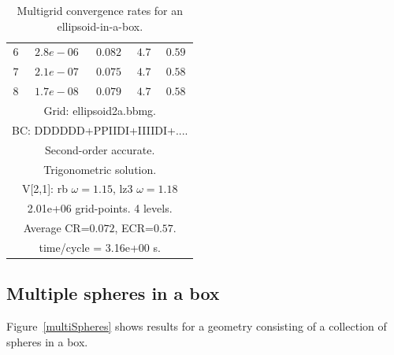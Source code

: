 \begin{table}[hbt]
\begin{center}
{\begin{tabular}{|c|c|c|c|c|}
 $ 6$  & $ 2.8e-06$ & $0.082$ & $ 4.7$ & $0.59$ \\ 
 $ 7$  & $ 2.1e-07$ & $0.075$ & $ 4.7$ & $0.58$ \\ 
 $ 8$  & $ 1.7e-08$ & $0.079$ & $ 4.7$ & $0.58$ \\ 
\hline 
\multicolumn{5}{|c|}{Grid: ellipsoid2a.bbmg.}  \\
\multicolumn{5}{|c|}{BC: DDDDDD+PPIIDI+IIIIDI+....}  \\
\multicolumn{5}{|c|}{Second-order accurate.}  \\
\multicolumn{5}{|c|}{Trigonometric solution.}  \\
\multicolumn{5}{|c|}{V[2,1]: rb $\omega=1.15$, lz3 $\omega=1.18$}  \\
\multicolumn{5}{|c|}{2.01e+06 grid-points. 4 levels.}  \\
\multicolumn{5}{|c|}{Average CR=$0.072$, ECR=$0.57$.}  \\
\multicolumn{5}{|c|}{time/cycle = 3.16e+00 s.}  \\
\hline 
\end{tabular}
} %
\end{center}
\caption{Multigrid convergence rates for an ellipsoid-in-a-box.}
\label{fig:smoothBox}
\end{table}




\clearpage
\subsection{Multiple spheres in a box}

Figure~\ref{multiSpheres} shows results for a geometry consisting of a collection of spheres in a box.


